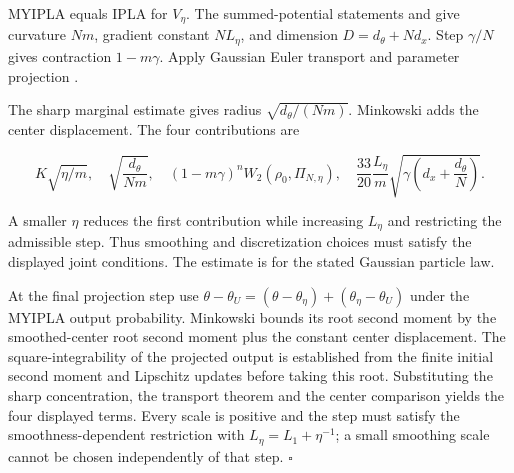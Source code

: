 \documentclass[11pt,a4paper]{article}
\begin{document}
MYIPLA equals IPLA for \(V_\eta\). The summed-potential statements \cite[Section~3.1.3]{LangevinLean2026IPLA} and \cite[Section~3.1.4]{LangevinLean2026IPLA} give curvature \(Nm\), gradient constant \(NL_\eta\), and dimension \(D=d_\theta+Nd_x\). Step \(\gamma/N\) gives contraction \(1-m\gamma\). Apply Gaussian Euler transport \cite[Section~3.45.7]{LangevinLean2026ULASC} and parameter projection \cite[Section~3.48.9]{LangevinLean2026ULASC}.



The sharp marginal estimate \cite[Section~3.6.1]{LangevinLean2026Proximal} gives radius \(\sqrt{d_\theta/(Nm)}\). Minkowski adds the center displacement. The four contributions are

\[K\sqrt{\eta/m},\quad\sqrt{\frac{d_\theta}{Nm}},\quad
(1-m\gamma)^nW_2(\rho_0,\Pi_{N,\eta}),\quad
\frac{33}{20}\frac{L_\eta}{m}\sqrt{\gamma\left(d_x+\frac{d_\theta}{N}\right)}.\]

A smaller \(\eta\) reduces the first contribution while increasing \(L_\eta\) and restricting the admissible step. Thus smoothing and discretization choices must satisfy the displayed joint conditions. The estimate is for the stated Gaussian particle law.




At the final projection step use \(\theta-\theta_U=(\theta-\theta_\eta)+(\theta_\eta-\theta_U)\) under the MYIPLA output probability. Minkowski bounds its root second moment by the smoothed-center root second moment plus the constant center displacement. The square-integrability of the projected output is established from the finite initial second moment and Lipschitz updates before taking this root. Substituting the sharp concentration, the transport theorem and the center comparison yields the four displayed terms. Every scale is positive and the step must satisfy the smoothness-dependent restriction with \(L_\eta=L_1+\eta^{-1}\); a small smoothing scale cannot be chosen independently of that step. \(\square\)
\end{document}
